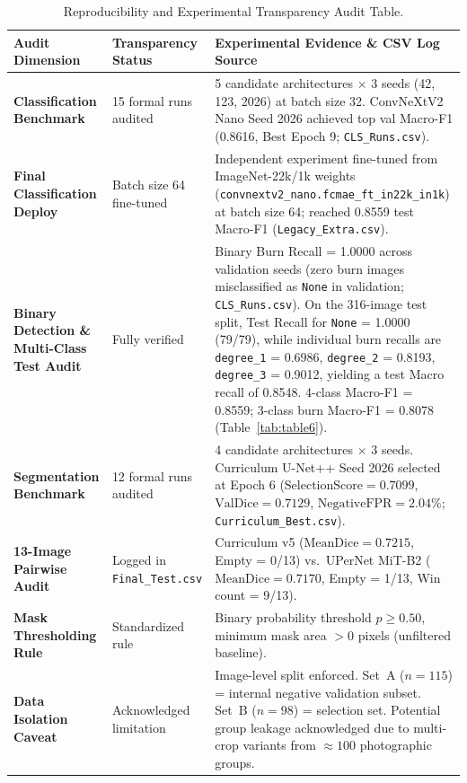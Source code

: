 \documentclass[11pt,a4paper]{article}
\begin{document}
\begin{table}[H]
\centering
\caption{Reproducibility and Experimental Transparency Audit Table.}
\label{tab:table4}
\small
\begin{tabularx}{\textwidth}{p{4.2cm} p{3.2cm} X}
\toprule
\textbf{Audit Dimension} & \textbf{Transparency Status} & \textbf{Experimental Evidence \& CSV Log Source} \\
\midrule
\textbf{Classification Benchmark} & 15 formal runs audited & 5 candidate architectures $\times$ 3 seeds (42, 123, 2026) at batch size 32. ConvNeXtV2 Nano Seed 2026 achieved top val Macro-F1 (0.8616, Best Epoch 9; \texttt{CLS\_Runs.csv}). \\
\addlinespace
\textbf{Final Classification Deploy} & Batch size 64 fine-tuned & Independent experiment fine-tuned from ImageNet-22k/1k weights (\texttt{convnextv2\_nano.fcmae\_ft\_in22k\_in1k}) at batch size 64; reached 0.8559 test Macro-F1 (\texttt{Legacy\_Extra.csv}). \\
\addlinespace
\textbf{Binary Detection \& Multi-Class Test Audit} & Fully verified & Binary Burn Recall = 1.0000 across validation seeds (zero burn images misclassified as \texttt{None} in validation; \texttt{CLS\_Runs.csv}). On the 316-image test split, Test Recall for \texttt{None} = 1.0000 (79/79), while individual burn recalls are \texttt{degree\_1} = 0.6986, \texttt{degree\_2} = 0.8193, \texttt{degree\_3} = 0.9012, yielding a test Macro recall of 0.8548. 4-class Macro-F1 = 0.8559; 3-class burn Macro-F1 = 0.8078 (Table~\ref{tab:table6}). \\
\addlinespace
\textbf{Segmentation Benchmark} & 12 formal runs audited & 4 candidate architectures $\times$ 3 seeds. Curriculum U-Net++ Seed 2026 selected at Epoch 6 ($\text{SelectionScore} = 0.7099$, $\text{ValDice} = 0.7129$, $\text{NegativeFPR} = 2.04\%$; \texttt{Curriculum\_Best.csv}). \\
\addlinespace
\textbf{13-Image Pairwise Audit} & Logged in \texttt{Final\_Test.csv} & Curriculum v5 ($\text{MeanDice} = 0.7215$, Empty = 0/13) vs.\ UPerNet MiT-B2 ($\text{MeanDice} = 0.7170$, Empty = 1/13, Win count = 9/13). \\
\addlinespace
\textbf{Mask Thresholding Rule} & Standardized rule & Binary probability threshold $p \ge 0.50$, minimum mask area $> 0$ pixels (unfiltered baseline). \\
\addlinespace
\textbf{Data Isolation Caveat} & Acknowledged limitation & Image-level split enforced. Set~A ($n = 115$) = internal negative validation subset. Set~B ($n = 98$) = selection set. Potential group leakage acknowledged due to multi-crop variants from $\approx 100$ photographic groups. \\
\bottomrule
\end{tabularx}
\end{table}
\end{document}
